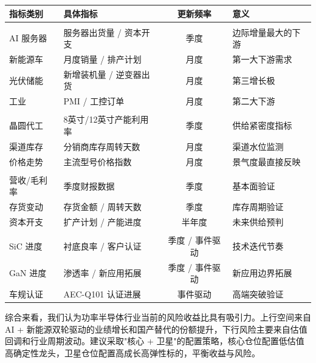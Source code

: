 \begin{exhibitbox}[表 10-1：功率半导体景气度跟踪指标体系]
\centering
\small
\begin{tabularx}{\textwidth}{X L{3cm} c L{4.5cm}}
\toprule
\textbf{指标类别} & \textbf{具体指标} & \textbf{更新频率} & \textbf{意义} \\
\midrule
{}
 \\
AI 服务器 & 服务器出货量 / 资本开支 & 季度 & 边际增量最大的下游 \\
新能源车 & 月度销量 / 排产计划 & 月度 & 第一大下游需求 \\
光伏储能 & 新增装机量 / 逆变器出货 & 月度 & 第三增长极 \\
工业 & PMI / 工控订单 & 月度 & 第二大下游 \\
\midrule
{}
 \\
晶圆代工 & 8英寸/12英寸产能利用率 & 季度 & 供给紧密度指标 \\
渠道库存 & 分销商库存周转天数 & 月度 & 渠道水位监测 \\
价格走势 & 主流型号价格指数 & 月度 & 景气度最直接反映 \\
\midrule
{}
 \\
营收/毛利率 & 季度财报数据 & 季度 & 基本面验证 \\
存货变动 & 存货金额 / 周转天数 & 季度 & 库存周期验证 \\
资本开支 & 扩产计划 / 产能进度 & 半年度 & 未来供给预判 \\
\midrule
{}
 \\
SiC 进度 & 衬底良率 / 客户认证 & 季度 / 事件驱动 & 技术迭代节奏 \\
GaN 进度 & 渗透率 / 新应用拓展 & 季度 / 事件驱动 & 新应用边界拓展 \\
车规认证 & AEC-Q101 认证进展 & 事件驱动 & 高端突破验证 \\
\bottomrule
\end{tabularx}
\end{exhibitbox}

\begin{keyinsight}[风险收益评估]
综合来看，我们认为功率半导体行业当前的风险收益比具有吸引力。上行空间来自 AI + 新能源双轮驱动的业绩增长和国产替代的份额提升，下行风险主要来自估值回调和行业周期波动。建议采取"核心 + 卫星"的配置策略，核心仓位配置低估值高确定性龙头，卫星仓位配置高成长高弹性标的，平衡收益与风险。
\end{keyinsight}
